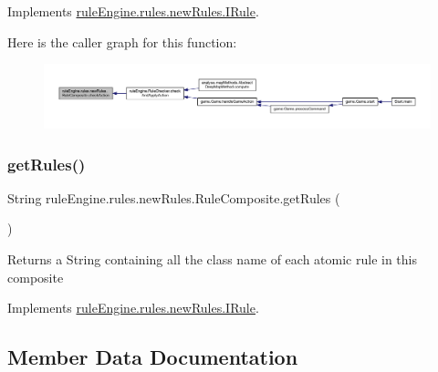 Implements \mbox{\hyperlink{interfacerule_engine_1_1rules_1_1new_rules_1_1_i_rule_a72ce29a47d7a5fba75a09444a50a481e}{rule\+Engine.\+rules.\+new\+Rules.\+I\+Rule}}.

Here is the caller graph for this function\+:
\nopagebreak
\begin{figure}[H]
\begin{center}
\leavevmode
\includegraphics[width=350pt]{classrule_engine_1_1rules_1_1new_rules_1_1_rule_composite_ab6815980fba07e2757c007ab2a819b8d_icgraph}
\end{center}
\end{figure}
\mbox{\label{classrule_engine_1_1rules_1_1new_rules_1_1_rule_composite_a9b41dd74104e0fc2b8bf4f3d13a44f37}} 
\subsubsection{\texorpdfstring{get\+Rules()}{getRules()}}
{\footnotesize\ttfamily String rule\+Engine.\+rules.\+new\+Rules.\+Rule\+Composite.\+get\+Rules (\begin{DoxyParamCaption}{ }\end{DoxyParamCaption})\hspace{0.3cm}{\ttfamily [inline]}}

\begin{DoxyReturn}{Returns}
a String containing all the class name of each atomic rule in this composite 
\end{DoxyReturn}


Implements \mbox{\hyperlink{interfacerule_engine_1_1rules_1_1new_rules_1_1_i_rule_a9d1c8d3f07b6ade794f60453449486c0}{rule\+Engine.\+rules.\+new\+Rules.\+I\+Rule}}.



\subsection{Member Data Documentation}
\mbox{\label{classrule_engine_1_1rules_1_1new_rules_1_1_rule_composite_a0f873c0c52e3cf4815d5b09a5ca2ae7f}} 
